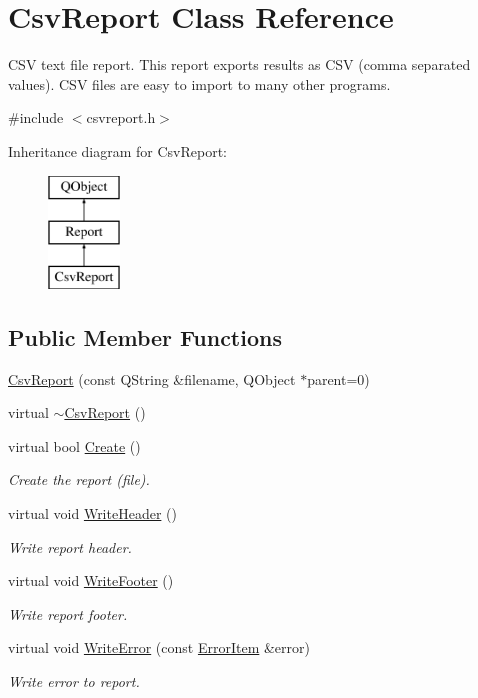 \hypertarget{class_csv_report}{\section{Csv\-Report Class Reference}
\label{class_csv_report}
}


C\-S\-V text file report. This report exports results as C\-S\-V (comma separated values). C\-S\-V files are easy to import to many other programs.  




{\ttfamily \#include $<$csvreport.\-h$>$}

Inheritance diagram for Csv\-Report\-:\begin{figure}[H]
\begin{center}
\leavevmode
\includegraphics[height=3.000000cm]{class_csv_report}
\end{center}
\end{figure}
\subsection*{Public Member Functions}
\begin{DoxyCompactItemize}
\item 
\hyperlink{class_csv_report_a53aa8d3df2bee1168302061e3a10cb35}{Csv\-Report} (const Q\-String \&filename, Q\-Object $\ast$parent=0)
\item 
virtual \hyperlink{class_csv_report_a2d4a7c3d0a934d2587c44476c3fb4b8d}{$\sim$\-Csv\-Report} ()
\item 
virtual bool \hyperlink{class_csv_report_a94819b4d4d2154acd19c96fd8c0cf3fc}{Create} ()
\begin{DoxyCompactList}\small\item\em Create the report (file). \end{DoxyCompactList}\item 
virtual void \hyperlink{class_csv_report_ade0f5d08ec9ea3ad5c4554d72f2a1bc3}{Write\-Header} ()
\begin{DoxyCompactList}\small\item\em Write report header. \end{DoxyCompactList}\item 
virtual void \hyperlink{class_csv_report_a8eef40efbd7ec1e26b86c709554117d2}{Write\-Footer} ()
\begin{DoxyCompactList}\small\item\em Write report footer. \end{DoxyCompactList}\item 
virtual void \hyperlink{class_csv_report_a4d65a8195f903a4a9b87dc2678d98a31}{Write\-Error} (const \hyperlink{class_error_item}{Error\-Item} \&error)
\begin{DoxyCompactList}\small\item\em Write error to report. \end{DoxyCompactList}\end{DoxyCompactItemize}
